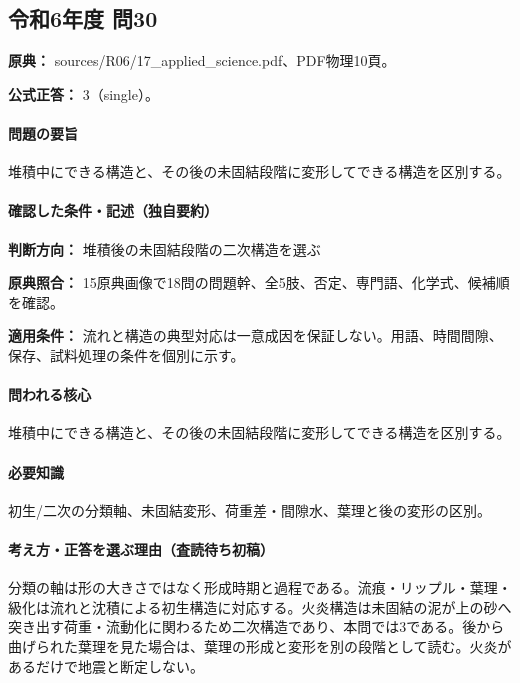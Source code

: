 \subsection{令和6年度 問30}
\label{q:r06-reg-applied-30}

\noindent\textbf{原典：} sources/R06/17\_applied\_science.pdf、PDF物理10頁。

\textbf{公式正答：} 3（single）。

\paragraph{問題の要旨} 堆積中にできる構造と、その後の未固結段階に変形してできる構造を区別する。

\paragraph{確認した条件・記述（独自要約）}\mbox{}\par

\noindent\textbf{判断方向：} 堆積後の未固結段階の二次構造を選ぶ\par

\noindent\textbf{原典照合：} 15原典画像で18問の問題幹、全5肢、否定、専門語、化学式、候補順を確認。\par

\noindent\textbf{適用条件：} 流れと構造の典型対応は一意成因を保証しない。用語、時間間隙、保存、試料処理の条件を個別に示す。\par

\paragraph{問われる核心} 堆積中にできる構造と、その後の未固結段階に変形してできる構造を区別する。

\paragraph{必要知識} 初生/二次の分類軸、未固結変形、荷重差・間隙水、葉理と後の変形の区別。

\paragraph{考え方・正答を選ぶ理由（査読待ち初稿）} 分類の軸は形の大きさではなく形成時期と過程である。流痕・リップル・葉理・級化は流れと沈積による初生構造に対応する。火炎構造は未固結の泥が上の砂へ突き出す荷重・流動化に関わるため二次構造であり、本問では3である。後から曲げられた葉理を見た場合は、葉理の形成と変形を別の段階として読む。火炎があるだけで地震と断定しない。

